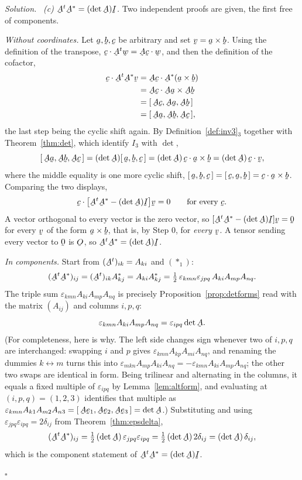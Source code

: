 \documentclass[17pt,a4paper]{extreport}
\DeclareRobustCommand{\vek}[1]{\underaccent{\tilde}{#1}}
\newcommand{\I}{\vek{I}}
\newcommand{\Ob}{\vek{O}}
\newcommand{\ba}{\vek{a}}
\newcommand{\bb}{\vek{b}}
\newcommand{\bc}{\vek{c}}
\newcommand{\bv}{\vek{v}}
\newcommand{\bw}{\vek{w}}
\newcommand{\be}{\vek{e}}
\newcommand{\bze}{\vek{0}}
\newcommand{\bA}{\vek{A}}
\newcommand{\dd}{\delta}
\newcommand{\eps}{\varepsilon}
\newcommand{\tbox}[3]{[\,#1,#2,#3\,]}
\newcommand{\ip}[2]{#1\cdot#2}
\theoremstyle{scplain}
\theoremstyle{scdefn}
\theoremstyle{scplain}
\newenvironment{solution}
 {\par\smallskip\noindent\textit{Solution.}\ }
 {\hfill$\square$\par\medskip}
\begin{document}
\begin{solution}
\medskip
\emph{(c) $\bA^{t}\bA^{*}=(\det\bA)\I$.}
Two independent proofs are given, the first free of components.

\emph{Without coordinates.} Let $\ba,\bb,\bc$ be arbitrary and set
$\bv=\ba\times\bb$. Using the definition of the transpose,
$\ip{\bc}{\bA^{t}\bw}=\ip{\bA\bc}{\bw}$, and then the definition of the
cofactor,
\[
\begin{aligned}
   \ip{\bc}{\bA^{t}\bA^{*}\bv}
   &=\ip{\bA\bc}{\bA^{*}(\ba\times\bb)}\\
   &=\ip{\bA\bc}{\bA\ba\times\bA\bb}\\
   &=\tbox{\bA\bc}{\bA\ba}{\bA\bb}\\
   &=\tbox{\bA\ba}{\bA\bb}{\bA\bc},
\end{aligned}
\]
the last step being the cyclic shift again. By
Definition~\ref{def:inv3}$_{3}$ together with Theorem~\ref{thm:det}, which
identify $I_{3}$ with $\det$,
\[
   \tbox{\bA\ba}{\bA\bb}{\bA\bc}=(\det\bA)\tbox\ba\bb\bc
   =(\det\bA)\,\ip{\bc}{\ba\times\bb}=(\det\bA)\,\ip\bc\bv ,
\]
where the middle equality is one more cyclic shift,
$\tbox\ba\bb\bc=\tbox\bc\ba\bb=\ip{\bc}{\ba\times\bb}$. Comparing the two
displays,
\[
   \ip{\bc}{\big[\bA^{t}\bA^{*}-(\det\bA)\I\big]\bv}=0
   \qquad\text{for every }\bc .
\]
A vector orthogonal to every vector is the zero vector, so
$[\bA^{t}\bA^{*}-(\det\bA)\I]\bv=\bze$ for every $\bv$ of the form
$\ba\times\bb$, that is, by Step 0, for \emph{every} $\bv$. A tensor
sending every vector to $\bze$ is $\Ob$, so $\bA^{t}\bA^{*}=(\det\bA)\I$.

\emph{In components.} Start from $(\bA^{t})_{ik}=A_{ki}$ and $(\ast_1)$:
\[
   (\bA^{t}\bA^{*})_{ij}=(\bA^{t})_{ik}A^{*}_{kj}=A_{ki}A^{*}_{kj}
   =\tfrac12\,\eps_{kmn}\eps_{jpq}\,A_{ki}A_{mp}A_{nq}.
\]
The triple sum $\eps_{kmn}A_{ki}A_{mp}A_{nq}$ is precisely
Proposition~\ref{prop:detforms} read with the matrix $(A_{ij})$ and columns
$i,p,q$:
\[
   \eps_{kmn}A_{ki}A_{mp}A_{nq}=\eps_{ipq}\det\bA .
\]
(For completeness, here is why. The left side changes sign whenever two of
$i,p,q$ are interchanged: swapping $i$ and $p$ gives
$\eps_{kmn}A_{kp}A_{mi}A_{nq}$, and renaming the dummies $k\leftrightarrow
m$ turns this into $\eps_{mkn}A_{mp}A_{ki}A_{nq}
=-\eps_{kmn}A_{ki}A_{mp}A_{nq}$; the other two swaps are identical in form.
Being trilinear and alternating in the columns, it equals a fixed multiple
of $\eps_{ipq}$ by Lemma~\ref{lem:altform}, and evaluating at
$(i,p,q)=(1,2,3)$ identifies that multiple as
$\eps_{kmn}A_{k1}A_{m2}A_{n3}=\tbox{\bA\be_{1}}{\bA\be_{2}}{\bA\be_{3}}
=\det\bA$.)
Substituting and using $\eps_{jpq}\eps_{ipq}=2\dd_{ij}$ from
Theorem~\ref{thm:epsdelta},
\[
   (\bA^{t}\bA^{*})_{ij}=\tfrac12\,(\det\bA)\,\eps_{jpq}\eps_{ipq}
   =\tfrac12\,(\det\bA)\,2\dd_{ij}=(\det\bA)\,\dd_{ij},
\]
which is the component statement of $\bA^{t}\bA^{*}=(\det\bA)\I$.


\end{solution}
\end{document}
